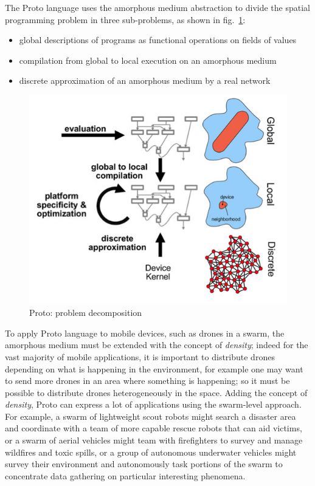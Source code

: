 The Proto\cite{proto} language uses the amorphous medium abstraction\cite{medium} to divide the spatial programming problem in three sub-problems, as shown in fig.~\ref{fig:proto}:

\begin{itemize}
\itemsep2pt
\item{
global descriptions of programs as functional operations on fields of values
}
\item{
compilation from global to local execution on an amorphous medium
}
\item{
discrete approximation of an amorphous medium by a real network
}
\end{itemize}


\begin{figure}[htb]
  \centering
  \includegraphics[width=\linewidth]{pictures/Proto.png}
  \caption{Proto: problem decomposition}
  \label{fig:proto}
\end{figure}

To apply Proto\cite{proto} language to mobile devices, such as drones in a swarm, the amorphous medium\cite{medium} must be extended with the concept of \textit{density}; indeed for the vast majority of mobile applications, it is important to distribute drones depending on what is happening in the environment, for example one may want to send more drones in an area where something is happening; so it must be possible to distribute drones heterogeneously in the space.
Adding the concept of \textit{density}, Proto can express a lot of applications using the swarm-level approach.
For example, a swarm of lightweight scout robots might search a disaster area and coordinate with a team of more capable rescue robots that can aid victims, or a swarm of aerial vehicles might team with firefighters to survey and manage wildfires and toxic spills, or a group of autonomous underwater vehicles might survey their environment and autonomously task portions of the swarm to concentrate data gathering on particular interesting phenomena.
\newpage

